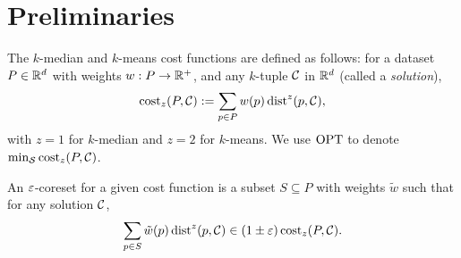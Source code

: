 \section{Preliminaries}

The $k$-median and $k$-means cost functions are defined as follows: 
for a dataset $P \in \mathbb{R}^d$ with weights $w : P \rightarrow \mathbb{R}^+$, and any $k$-tuple $\mathcal C$ in $\mathbb{R}^d$ (called a \emph{solution}), 
\[\operatorname{cost}_z(P, \mathcal C) := \sum_{p \in P} w(p) \operatorname{dist}^z(p, \mathcal C),\]
with $z=1$ for $k$-median and $z=2$ for $k$-means. We use $\text{OPT}$ to denote $\min_{\mathcal S} \operatorname{cost}_z(P, \mathcal C)$.

An $\varepsilon$-coreset for a given cost function is a subset $S \subseteq P$ with weights $\tilde w$ such that
for any solution $\mathcal C$,
\[\sum_{p \in S} \tilde w(p) \operatorname{dist}^z(p, \mathcal C) \in (1 \pm \varepsilon) \operatorname{cost}_z(P, \mathcal C).\]




%
%

